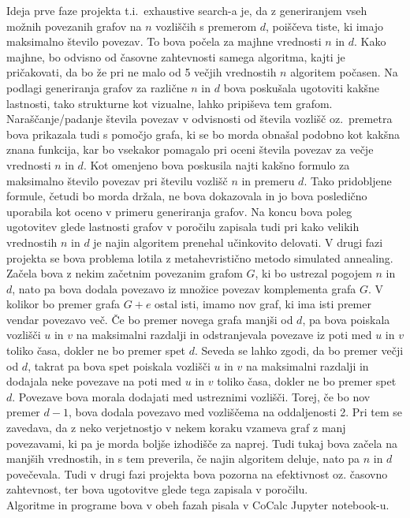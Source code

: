 \documentclass[12pt,a4paper]{amsart}
\theoremstyle{definition} %
\theoremstyle{plain} %
\begin{document}
Ideja prve faze projekta t.i.\ exhaustive search-a je, da z generiranjem vseh možnih povezanih grafov na $n$ vozliščih s premerom $d$, 
poiščeva tiste, ki imajo maksimalno število povezav. To bova počela za majhne vrednosti $n$ in $d$. Kako majhne, bo odvisno od časovne 
zahtevnosti samega algoritma, kajti je pričakovati, da bo že pri ne malo od 5 večjih vrednostih $n$ algoritem počasen. Na podlagi 
generiranja grafov za različne $n$ in $d$ bova poskušala ugotoviti kakšne lastnosti, tako strukturne kot vizualne, lahko pripiševa 
tem grafom. Naraščanje/padanje števila povezav v odvisnosti od števila vozlišč oz.\ premetra bova prikazala tudi s pomočjo grafa, 
ki se bo morda obnašal podobno kot kakšna znana funkcija, kar bo vsekakor pomagalo pri oceni števila povezav za večje vrednosti $n$ 
in $d$. Kot omenjeno bova poskusila najti kakšno formulo za maksimalno število povezav pri številu vozlišč $n$ in premeru $d$. Tako 
pridobljene formule, četudi bo morda držala, ne bova dokazovala in jo bova posledično uporabila kot oceno v primeru generiranja grafov. 
Na koncu bova poleg ugotovitev glede lastnosti grafov v poročilu zapisala tudi pri kako velikih vrednostih $n$ in $d$ je najin algoritem 
prenehal učinkovito delovati. V drugi fazi projekta se bova problema lotila z metahevristično metodo simulated annealing. Začela bova z 
nekim začetnim povezanim grafom $G$, ki bo ustrezal pogojem $n$ in $d$, nato pa bova dodala povezavo iz množice povezav komplementa grafa $G$. 
V kolikor bo premer grafa $G + e$ ostal isti, imamo nov graf, ki ima isti premer vendar povezavo več. Če bo premer novega grafa manjši od $d$, 
pa bova poiskala vozlišči $u$ in $v$ na maksimalni razdalji in odstranjevala povezave iz poti med $u$ in $v$ toliko časa, dokler ne bo premer 
spet $d$. Seveda se lahko zgodi, da bo premer večji od $d$, takrat pa bova spet poiskala vozlišči $u$ in $v$ na maksimalni razdalji in dodajala 
neke povezave na poti med $u$ in $v$ toliko časa, dokler ne bo premer spet $d$. Povezave bova morala dodajati med ustreznimi vozlišči. Torej, 
če bo nov premer $d-1$, bova dodala povezavo med vozliščema na oddaljenosti 2. Pri tem se zavedava, da z neko verjetnostjo v nekem koraku vzameva 
graf z manj povezavami, ki pa je morda boljše izhodišče za naprej. \pagebreak Tudi tukaj bova začela na manjših vrednostih, in s tem preverila, če najin 
algoritem deluje, nato pa $n$ in $d$ povečevala. Tudi v drugi fazi projekta bova pozorna na efektivnost oz. časovno zahtevnost, ter bova ugotovitve 
glede tega zapisala v poročilu.\\
Algoritme in programe bova v obeh fazah pisala v CoCalc Jupyter notebook-u.
\end{document}
